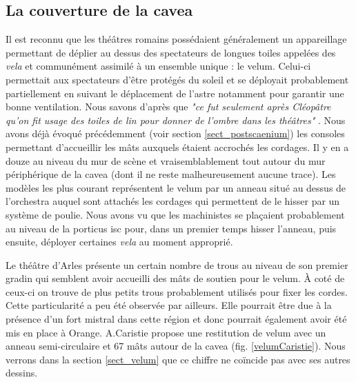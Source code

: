 		\subsection{La couverture de la \gls{cavea}} \label{section velum}
		
		Il est reconnu que les théâtres romains possédaient généralement un appareillage permettant de déplier au dessus des spectateurs de longues toiles appelées des \textit{vela} et communément assimilé à un ensemble unique : le \gls{velum}. Celui-ci permettait aux spectateurs d'être protégés du soleil et se déployait probablement partiellement en suivant le déplacement de l'astre notamment pour garantir une bonne ventilation. Nous savons d'après \cite{pline} que \textit{"ce fut seulement après Cléopâtre qu'on fit usage des toiles de lin pour donner de l'ombre dans les théâtres"} \cite{formige}. Nous avons déjà évoqué précédemment (voir section \ref{sect_postscaenium}) les \glspl{console} permettant d'accueillir les mâts auxquels étaient accrochés les cordages. Il y en a douze au niveau du mur de scène et vraisemblablement tout autour du mur périphérique de la \gls{cavea} (dont il ne reste malheureusement aucune trace). Les modèles les plus courant représentent le \gls{velum} par un anneau situé au dessus de l'\gls{orchestra} auquel sont attachés les cordages qui permettent de le hisser par un système de poulie. Nous avons vu que les machinistes se plaçaient probablement au niveau de la \gls{porticus isc} pour, dans un premier temps hisser l'anneau, puis ensuite, déployer certaines \textit{vela} au moment approprié.  
		
		Le théâtre d'Arles présente un certain nombre de trous au niveau de son premier gradin qui semblent avoir accueilli des mâts de soutien pour le \gls{velum}. \`{A} coté de ceux-ci on trouve de plus petits trous probablement utilisés pour fixer les cordes. Cette particularité a peu été observée par ailleurs. Elle pourrait être due à la présence d'un fort mistral dans cette région et donc pourrait également avoir été mis en place à Orange.
		A.Caristie propose une restitution de \gls{velum} avec un anneau semi-circulaire et 67 mâts autour de la \gls{cavea} (fig. \ref{velumCaristie}). Nous verrons dans la section \ref{sect_velum} que ce chiffre ne coïncide pas avec ses autres dessins.
		
